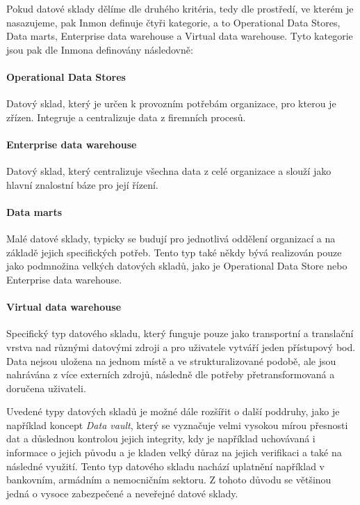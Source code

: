 \documentclass[
  digital,     %
  twoside,     %
  lof,         %
  lot,         %
]{fithesis4}
\begin{document}
 \vspace{5mm}
Pokud datové sklady dělíme dle druhého kritéria, tedy dle prostředí, ve kterém je
nasazujeme, pak Inmon definuje čtyři kategorie, a to Operational Data Stores, Data marts,
Enterprise data warehouse a Virtual data warehouse. Tyto kategorie jsou pak dle Inmona definovány následovně:

\paragraph{Operational Data Stores}
Datový sklad, který je určen k provozním potřebám organizace, pro kterou je zřízen. Integruje a centralizuje data z firemních procesů.
\paragraph{Enterprise data warehouse}
Datový sklad, který centralizuje všechna data z celé organizace a slouží jako hlavní znalostní báze pro její řízení.
\paragraph{Data marts}
Malé datové sklady, typicky se budují pro jednotlivá oddělení organizací a na základě jejich specifických potřeb. Tento typ také někdy bývá realizován pouze jako podmnožina velkých datových skladů, jako je Operational Data Store nebo Enterprise data warehouse.\parencite{Inmon2021}
\paragraph{Virtual data warehouse}
Specifický typ datového skladu, který funguje pouze jako transportní a translační vrstva nad různými datovými zdroji a pro uživatele vytváří jeden přístupový bod. Data nejsou uložena na jednom místě a ve strukturalizované podobě, ale jsou nahrávána z více externích zdrojů, následně dle potřeby přetransformovaná a doručena uživateli. 

\vspace{5mm}
Uvedené typy datových skladů je možné dále rozšířit o další poddruhy, jako je například koncept \emph{Data vault}, který se vyznačuje velmi vysokou mírou přesnosti dat a důslednou kontrolou jejich integrity, kdy je například uchovávaná i informace o jejich původu a je kladen velký důraz na jejich verifikaci a také na následné využití. Tento typ datového skladu nachází uplatnění například v bankovním, armádním a nemocničním sektoru. Z tohoto důvodu se většinou jedná o vysoce zabezpečené a neveřejné datové sklady.\parencite{Inmon2021}
\end{document}
